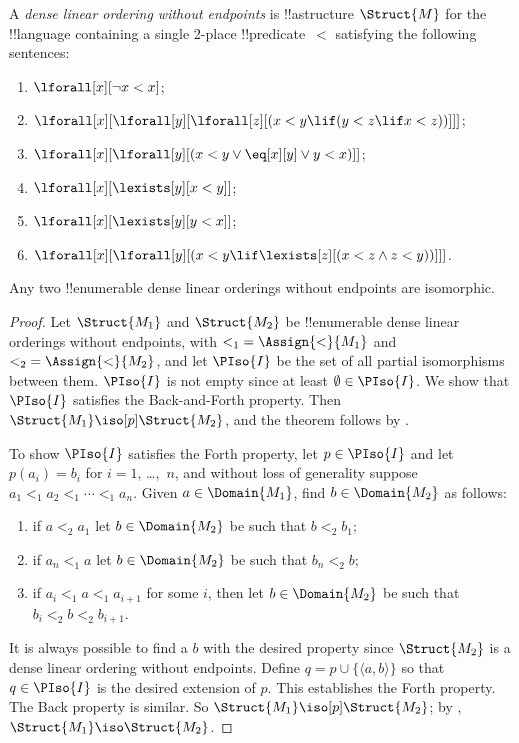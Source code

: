 \documentclass[../../../include/open-logic-section]{subfiles}
\begin{document}

\begin{defn}
  A \emph{dense linear ordering without endpoints} is !!a{structure}
  $\Struct{M}$ for the !!{language} containing a single 2-place
  !!{predicate}~$<$ satisfying the following sentences:
  \begin{enumerate}
  \item $\lforall[x][\lnot x < x]$;
  \item $\lforall[x][\lforall[y][\lforall[z][(x < y \lif (y < z \lif x
    <z ))]]]$;
  \item $\lforall[x][\lforall[y][(x< y \lor \eq[x][y] \lor y < x)]]$;
  \item $\lforall[x][\lexists[y][x < y]]$;
  \item $\lforall[x][\lexists[y][y < x]]$;
  \item $\lforall[x][\lforall[y][(x < y \lif \lexists[z][(x < z \land
        z < y))]]]$.
 \end{enumerate}
\end{defn}

\begin{thm}
  Any two !!{enumerable} dense linear orderings without
  endpoints are isomorphic.
\end{thm}

\begin{proof}
  Let $\Struct{M_1}$ and $\Struct{M_2}$ be !!{enumerable} dense linear
  orderings without endpoints, with ${<_1} = \Assign{<}{M_1}$ and ${<_2} =
  \Assign{<}{M_2}$, and let $\PIso{I}$ be the set of all partial
  isomorphisms between them. $\PIso{I}$ is not empty since at least
  $\emptyset \in \PIso{I}$. We show that $\PIso{I}$ satisfies the
  Back-and-Forth property.  Then $\Struct{M_1} \iso[p] \Struct{M_2}$,
  and the theorem follows by .

  To show $\PIso{I}$ satisfies the Forth property, let $p \in
  \PIso{I}$ and let $p(a_i) = b_i$ for $i = 1$, \dots,~$n$, and
  without loss of generality suppose $a_1 <_1 a_2 <_1 \cdots <_1
  a_n$. Given $a \in \Domain{M_1}$, find $b \in \Domain{M_2}$ as
  follows:
  \begin{enumerate}
  \item if $a <_2 a_1$ let $b \in \Domain{M_2}$ be such that $b <_2
    b_1$;
  \item if $a_n <_1 a$ let $b \in \Domain{M_2}$ be such that $b_n <_2 b$;
 \item if $a_i <_1 a <_1 a_{i+1}$ for some $i$, then let $b \in
   \Domain{M_2}$ be such that $b_i <_2 b <_2 b_{i+1}$.
  \end{enumerate}
  It is always possible to find a $b$ with the desired property since
  $\Struct{M_2}$ is a dense linear ordering without endpoints. Define
  $q = p \cup \{ \langle a, b \rangle \}$ so that $q \in \PIso{I}$ is
  the desired extension of $p$. This establishes the Forth
  property. The Back property is similar. So $\Struct{M_1} \iso[p]
  \Struct{M_2}$; by , $\Struct{M_1} \iso
  \Struct{M_2}$.
\end{proof}
\end{document}
